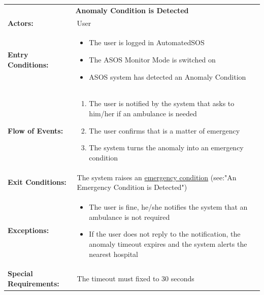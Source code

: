 \begin{table}[H]
	\centering
	{\renewcommand{\arraystretch}{1.5}%
		\begin{tabular}{|@{\hspace{2em}} p{4cm} @{}| p{11cm} @{\qquad}|}
			\cline{1-2}
			\multicolumn{2}{|c|}{\textbf{Anomaly Condition is Detected}} \\ \cline{1-2}
			\textbf{Actors:} & User\\ \cline{1-2}
			\textbf{Entry Conditions:} & \begin{itemize}[topsep=0em, itemsep=-0.2em]
				\item The user is logged in AutomatedSOS
				\item The ASOS Monitor Mode is switched on
				\item ASOS system has detected an Anomaly Condition 
			\end{itemize} \\ \cline{1-2}
			\textbf{Flow of Events:} & \begin{enumerate}[topsep=0em, itemsep=-0.2em]
				\item The user is notified by the system that asks to him/her if an ambulance is needed 
				\item The user confirms that is a matter of emergency
				\item The system turns the anomaly into an emergency condition
			\end{enumerate}\\ \cline{1-2}
			\textbf{Exit Conditions:} & The system raises an \underline{emergency condition} (see:"An Emergency Condition is Detected")\\ \cline{1-2}
			\textbf{Exceptions:} & \begin{itemize}[topsep=0em, itemsep=-0.2em]
				\item The user is fine, he/she notifies the system that an ambulance is not required
				\item If the user does not reply to the notification, the anomaly timeout expires and the system alerts the nearest hospital
			\end{itemize} \\ \cline{1-2}
			\textbf{Special Requirements:} & The timeout must fixed to 30 seconds \\ \cline{1-2}
	\end{tabular}} \quad
\end{table}

